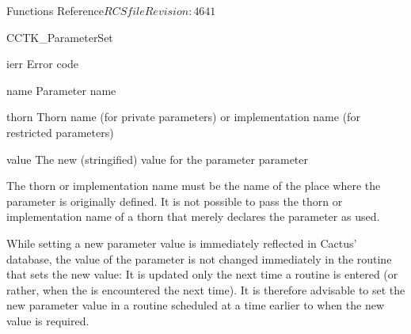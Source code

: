 \begin{cactuspart}{ Functions Reference}{$RCSfile$}{$Revision: 4641 $}
\begin{FunctionDescription}{CCTK\_ParameterSet}
\begin{ResultSection}
\begin{Result}{ierr}
Error code
\end{Result}
\end{ResultSection}

\begin{ParameterSection}
\begin{Parameter}{name}
Parameter name
\end{Parameter}
\begin{Parameter}{thorn}
Thorn name (for private parameters) or implementation name (for restricted parameters)
\end{Parameter}
\begin{Parameter}{value}
The new (stringified) value for the parameter parameter
\end{Parameter}
\end{ParameterSection}

\begin{Discussion}
The thorn or implementation name must be the name of the place where
the parameter is originally defined.  It is not possible to pass the
thorn or implementation name of a thorn that merely declares the
parameter as used.

While setting a new parameter value is immediately reflected in
Cactus' database, the value of the parameter is not changed
immediately in the routine that sets the new value: It is updated only
the next time a routine is entered (or rather, when the
 is encountered the next time). It is
therefore advisable to set the new parameter value in a routine
scheduled at a time earlier to when the new value is required.
\end{Discussion}


\end{FunctionDescription}
\end{cactuspart}
